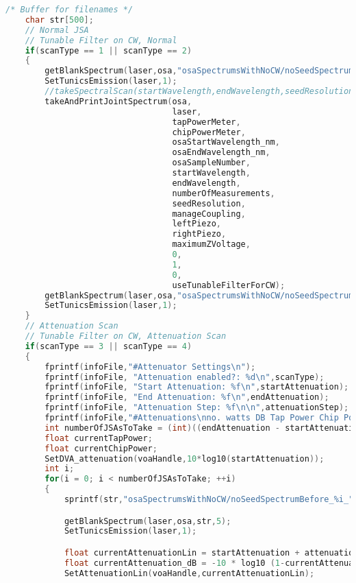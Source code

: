 \begin{lstlisting}[style=customc, language=C]
    /* Buffer for filenames */
    char str[500];
    // Normal JSA
    // Tunable Filter on CW, Normal
    if(scanType == 1 || scanType == 2)
    {
        getBlankSpectrum(laser,osa,"osaSpectrumsWithNoCW/noSeedSpectrumBefore",5);
        SetTunicsEmission(laser,1);
        //takeSpectralScan(startWavelength,endWavelength,seedResolution,0,chipPowerMeter,tapPowerMeter,laser);
        takeAndPrintJointSpectrum(osa,
                                  laser,
                                  tapPowerMeter,
                                  chipPowerMeter,
                                  osaStartWavelength_nm,
                                  osaEndWavelength_nm,
                                  osaSampleNumber,
                                  startWavelength,
                                  endWavelength,
                                  numberOfMeasurements,
                                  seedResolution,
                                  manageCoupling,
                                  leftPiezo,
                                  rightPiezo,
                                  maximumZVoltage,
                                  0,
                                  1,
                                  0,
                                  useTunableFilterForCW);
        getBlankSpectrum(laser,osa,"osaSpectrumsWithNoCW/noSeedSpectrumAfter",5);
        SetTunicsEmission(laser,1);
    }
    // Attenuation Scan
    // Tunable Filter on CW, Attenuation Scan
    if(scanType == 3 || scanType == 4)
    {
        fprintf(infoFile,"#Attenuator Settings\n");
        fprintf(infoFile, "Attenuation enabled?: %d\n",scanType);
        fprintf(infoFile, "Start Attenuation: %f\n",startAttenuation);
        fprintf(infoFile, "End Attenuation: %f\n",endAttenuation);
        fprintf(infoFile, "Attenuation Step: %f\n\n",attenuationStep);
        fprintf(infoFile,"#Attenuations\nno. watts DB Tap Power Chip Power\n");
        int numberOfJSAsToTake = (int)((endAttenuation - startAttenuation)/attenuationStep) + 1;
        float currentTapPower;
        float currentChipPower;
        SetDVA_attenuation(voaHandle,10*log10(startAttenuation));
        int i;
        for(i = 0; i < numberOfJSAsToTake; ++i)
        {
            sprintf(str,"osaSpectrumsWithNoCW/noSeedSpectrumBefore_%i_",i);

            getBlankSpectrum(laser,osa,str,5);
            SetTunicsEmission(laser,1);

            float currentAttenuationLin = startAttenuation + attenuationStep*(float)i;
            float currentAttenuation_dB = -10 * log10 (1-currentAttenuationLin);
            SetAttenuationLin(voaHandle,currentAttenuationLin);


\end{lstlisting}
